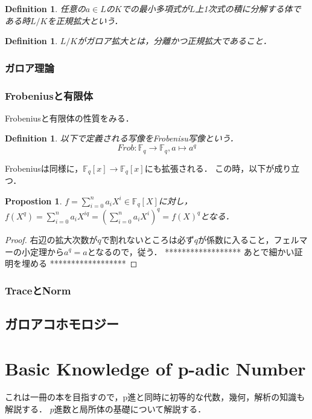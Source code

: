 \documentclass{ujarticle}
\newtheorem{dfn}[thm]{Definition}
\newtheorem{prop}[thm]{Propostion}
\begin{document}
\begin{dfn}
 任意の$a \in L$の$K$での最小多項式が$L$上1次式の積に分解する体である時$L/K$を正規拡大という．
\end{dfn}

\begin{dfn}
 $L/K$がガロア拡大とは，分離かつ正規拡大であること．
\end{dfn}
\subsubsection{ガロア理論}
\label{sub:ガロア理論}

\subsubsection{Frobeniusと有限体}
\label{sub:Frobeniusと有限体}
Frobeniusと有限体の性質をみる．
\begin{dfn}
  以下で定義される写像をFrobenisu写像という．
  \begin{equation*}
    Frob:\mathbb{F}_q　\to \mathbb{F}_q　,a \mapsto a^q
  \end{equation*}
\end{dfn}
Frobeniusは同様に，$\mathbb{F}_q[x] \to \mathbb{F}_q[x]$にも拡張される．
この時，以下が成り立つ．
\begin{prop}
 $f = \sum_{i=0}^n a_iX^i \in \mathbb{F}_q[X]$に対し，
 $f(X^q)=\sum_{i=0}^n a_iX^{iq} = (\sum_{i=0}^n a_iX^{i})^q=f(X)^q$となる．
\end{prop}
\begin{proof}
 右辺の拡大次数が$q$で割れないところは必ず$q$が係数に入ること，フェルマーの小定理から$a^q=a$となるので，従う．
 ******************
  あとで細かい証明を埋める
  ******************
\end{proof}

\subsubsection{TraceとNorm}
\label{sub:TraceとNorm}

\subsection{ガロアコホモロジー}
\label{sub:ガロアコホモロジー}


\section{Basic Knowledge of p-adic Number}
\label{sec:p-adic Number}
これは一冊の本を目指すので，p進と同時に初等的な代数，幾何，解析の知識も
解説する．
$p$進数と局所体の基礎について解説する．
\end{document}
